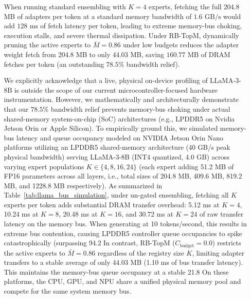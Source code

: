 \documentclass{article}
\theoremstyle{plain}
\theoremstyle{definition}
\theoremstyle{remark}
\begin{document}
When running standard ensembling with $K=4$ experts, fetching the full 204.8 MB of adapters per token at a standard memory bandwidth of $1.6\text{ GB/s}$ would add $128\text{ ms}$ of fetch latency per token, leading to extreme memory-bus choking, execution stalls, and severe thermal dissipation. Under RB-TopM, dynamically pruning the active experts to $\bar{M} = 0.86$ under low budgets reduces the adapter weight fetch from 204.8 MB to only 44.03 MB, saving $160.77\text{ MB}$ of DRAM fetches per token (an outstanding $78.5\%$ bandwidth relief).

We explicitly acknowledge that a live, physical on-device profiling of LLaMA-3-8B is outside the scope of our current microcontroller-focused hardware instrumentation.
However, we mathematically and architecturally demonstrate that our $78.5\%$ bandwidth relief prevents memory-bus choking under actual shared-memory system-on-chip (SoC) architectures (e.g., LPDDR5 on Nvidia Jetson Orin or Apple Silicon). To empirically ground this, we simulated memory-bus latency and queue occupancy modeled on NVIDIA Jetson Orin Nano platforms utilizing an LPDDR5 shared-memory architecture (40 GB/s peak physical bandwidth) serving LLaMA-3-8B (INT4 quantized, 4.0 GB) across varying expert populations $K \in \{4, 8, 16, 24\}$ (each expert adding 51.2 MB of FP16 parameters across all layers, i.e., total sizes of 204.8 MB, 409.6 MB, 819.2 MB, and 1228.8 MB respectively).
As summarized in Table~\ref{tab:llama_bus_simulation}, under un-gated ensembling, fetching all $K$ experts per token adds substantial DRAM transfer overhead: 5.12 ms at $K=4$, 10.24 ms at $K=8$, 20.48 ms at $K=16$, and 30.72 ms at $K=24$ of raw transfer latency on the memory bus. When generating at 10 tokens/second, this results in extreme bus contention, causing LPDDR5 controller queue occupancies to spike catastrophically (surpassing 94.2%
In contrast, RB-TopM ($C_{\text{budget}} = 0.0$) restricts the active experts to $\bar{M} = 0.86$ regardless of the registry size $K$, limiting adapter transfers to a stable average of only 44.03 MB (1.10 ms of bus transfer latency). This maintains the memory-bus queue occupancy at a stable 21.8%
On these platforms, the CPU, GPU, and NPU share a unified physical memory pool and compete for the same system memory bus.
\end{document}
